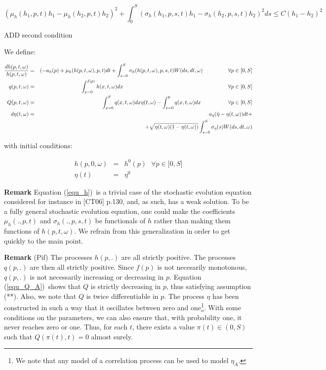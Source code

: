 \documentclass{article}
\begin{document}
\begin{equation*}
(\mu _{h}(h_{1},p,t)h_{1}-\mu _{h}(h_{2},p,t)h_{2})^{2}+\int_{0}^{S}(\sigma
_{h}(h_{1},p,s,t)h_{1}-\sigma _{h}(h_{2},p,s,t)h_{2})^{2}ds\leq
C(h_{1}-h_{2})^{2}
\end{equation*}

ADD second condition

\bigskip

We define:

\begin{eqnarray}
\frac{dh(p,t,\omega )}{h(p,t,\omega )} &=&(-a_{h}(p)+\mu _{h}(h(p,t,\omega
),p,t)dt+\int_{s=0}^{S}\sigma _{h}(h(p,t,\omega ),p,s,t)W(ds,dt,\omega )%
\text{ \ \ \ \ \ \ \ \ \ \ \ }\forall p\in \lbrack 0,S]  \label{equ_h_A} \\
q(p,t,\omega ) &=&\int_{x=0}^{f(p)}h(x,t,\omega )dx\text{ \ \ \ \ \ \ \ \ \
\ \ \ \ \ \ \ \ \ \ \ \ \ \ \ \ \ \ \ \ \ \ \ \ \ \ \ \ \ \ \ \ \ \ \ \ \ \
\ \ \ \ \ \ \ \ }\forall p\in \lbrack 0,S]  \label{equ_q_A} \\
Q(p,t,\omega ) &=&\int_{x=0}^{S}q(x,t,\omega )dx\eta (t,\omega
)-\int_{x=0}^{p}q(x,t,\omega )dx\text{ \ \ \ \ \ \ \ \ \ \ \ \ }\forall p\in
\lbrack 0,S]  \label{equ_Q_A} \\
d\eta (t,\omega ) &=&a_{\eta }(\bar{\eta}-\eta (t,\omega ))dt+
\label{equ_eta_A} \\
&&+\sqrt{\eta (t,\omega )(1-\eta (t,\omega ))}\int_{s=0}^{S}\sigma _{\eta
}(s)W(ds,dt,\omega )
\end{eqnarray}

with initial conditions:

\begin{eqnarray}
h(p,0,\omega ) &=&h^{0}(p)\text{ \ \ \ }\forall p\in \lbrack 0,S] \\
\eta (t) &=&\eta ^{0}
\end{eqnarray}

\textbf{Remark }Equation (\ref{equ_h})\ is a trivial case of the stochastic
evolution equation considered for instance in [CT06] p.130, and, as such,
has a weak solution. To be a fully general stochastic evolution equation,
one could make the coefficients $\mu _{h}(.,p,t)$ and $\sigma _{h}(.,p,s,t)$
be functionals of $h$ rather than making them functions of $h(p,t,\omega )$.
We refrain from this generalization in order to get quickly to the main
point.

\bigskip

\textbf{Remark} (Pif) The processes $h(p,.)$ are all strictly positive. The
processes $q(p,.)$ are then all strictly positive. Since $f(p)$ is not
necesarily monotonous, $q(p,.)$ is not necessarily increasing or decreasing
in $p$. Equation (\ref{equ_Q_A})\ shows that $Q$ is strictly decreasing in $%
p $, thus satisfying assumption (**). Also, we note that $Q$ is twice
differentiable in $p$. The process $\eta $ has been constructed in such a
way that it oscillates between zero and one\footnote{%
We note that any model of a correlation process can be used to model $\eta
_{A}$.}. With some conditions on the parameters, we can also ensure that,
with probability one, it never reaches zero or one. Thus, for each $t$,
there exists a value $\pi (t)\in (0,S)$ such that $Q(\pi (t),t)=0$ almost
surely.
\end{document}
